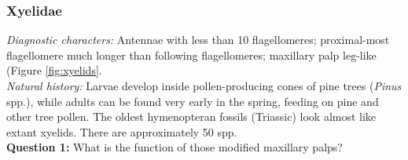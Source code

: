 \documentclass[letterpaper, 11pt]{article}
\begin{document}
\subsubsection{Xyelidae}
\noindent{}\textit{Diagnostic characters:} Antennae with less than 10 flagellomeres; proximal-most flagellomere much longer than following flagellomeres; maxillary palp leg-like (Figure \ref{fig:xyelids}.\\

\noindent{}\textit{Natural history:} Larvae develop inside pollen-producing cones of pine trees (\textit{Pinus} spp.), while adults can be found very early in the spring, feeding on pine and other tree pollen. The oldest hymenopteran fossils (Triassic) look almost like extant xyelids. There are approximately 50 spp.\\

\noindent\textbf{Question 1:} What is the function of those modified maxillary palps?\vspace{2cm}
\end{document}
